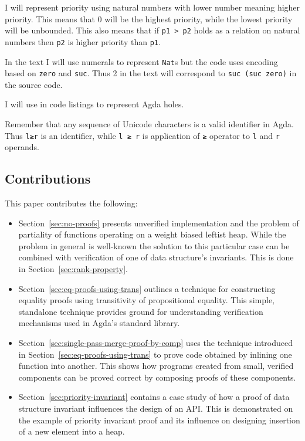 I will represent priority using natural numbers with lower number meaning higher priority. This means that 0 will be the highest priority, while the lowest priority will be unbounded. This also means that if \texttt{p1 > p2} holds as a relation on natural numbers then \texttt{p2} is higher priority than \texttt{p1}.

In the text I will use numerals to represent \texttt{Nat}s but the code uses encoding based on \texttt{zero} and \texttt{suc}. Thus 2 in the text will correspond to \texttt{suc (suc zero)} in the source code.

I will use \texttt{} in code listings to represent Agda holes.

Remember that any sequence of Unicode characters is a valid identifier in Agda. Thus \texttt{l≥r} is an identifier, while \texttt{l ≥ r} is application of \texttt{≥} operator to \texttt{l} and \texttt{r} operands.

\subsection{Contributions}

This paper contributes the following:

\begin{itemize}
 \item Section~\ref{sec:no-proofs} presents unverified implementation and the problem of partiality of functions operating on a weight biased leftist heap. While the problem in general is well-known the solution to this particular case can be combined with verification of one of data structure's invariants. This is done in Section~\ref{sec:rank-property}.
 \item Section~\ref{sec:eq-proofs-using-trans} outlines a technique for constructing equality proofs using transitivity of propositional equality. This simple, standalone technique provides ground for understanding verification mechanisms used in Agda's standard library.
 \item Section~\ref{sec:single-pass-merge-proof-by-comp} uses the technique introduced in Section~\ref{sec:eq-proofs-using-trans} to prove code obtained by inlining one function into another. This shows how programs created from small, verified components can be proved correct by composing proofs of these components.
 \item Section~\ref{sec:priority-invariant} contains a case study of how a proof of data structure invariant influences the design of an API. This is demonstrated on the example of priority invariant proof and its influence on designing insertion of a new element into a heap.
\end{itemize}
